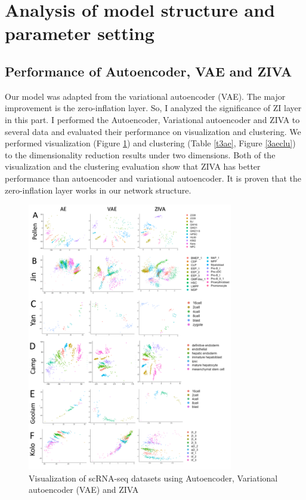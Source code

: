 \section{Analysis of model structure and parameter setting}
\subsection{Performance of Autoencoder, VAE and ZIVA}
Our model was adapted from the variational autoencoder (VAE). The major improvement is the zero-inflation layer. So, I analyzed the significance of ZI layer in this part. I performed the Autoencoder, Variational autoencoder and ZIVA to several data and evaluated their performance on visualization and clustering. We performed visualization (Figure \ref{3ae}) and clustering (Table \ref{t3ae}, Figure \ref{3aeclu}) to the dimensionality reduction results under two dimensions. Both of the visualization and the clustering evaluation show that ZIVA has better performance than autoencoder and variational autoencoder. It is proven that the zero-inflation layer works in our network structure. \\
\begin{figure}[htb!]
    \centering
    \includegraphics[width=0.8\textwidth]{figures/myfigures/3ae.png}
    \caption{Visualization of scRNA-seq datasets using Autoencoder, Variational autoencoder (VAE) and ZIVA}
    \label{3ae}
\end{figure}

